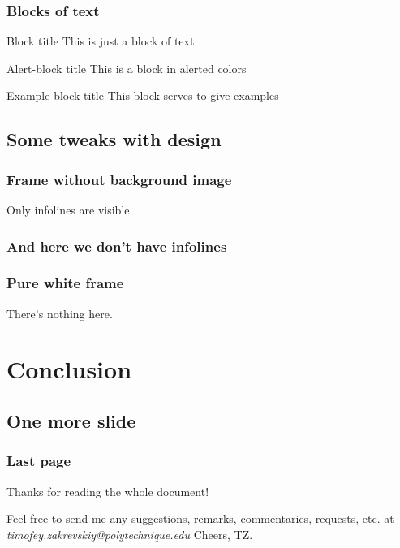 \documentclass{beamer}
\begin{document}
\begin{frame}
\frametitle{Blocks of text}
\begin{block}{Block title}
This is just a block of text
\end{block}

\begin{alertblock}{Alert-block title}
This is a block in alerted colors
\end{alertblock}

\begin{exampleblock}{Example-block title}
This block serves to give examples
\end{exampleblock}
\end{frame}

\subsection{Some tweaks with design}
{ %
\begin{frame}
\frametitle{Frame without background image}


Only infolines are visible.
\end{frame}
}

{%
\begin{frame}
\frametitle{And here we don't have infolines}
\end{frame}
}

{%
\begin{frame}
\frametitle{Pure white frame}

There's nothing here.

\end{frame}
}

\section{Conclusion}
\subsection{One more slide}
\begin{frame}
\frametitle{Last page}
Thanks for reading the whole document!

Feel free to send me any suggestions, remarks, commentaries, requests, etc. at \textit{{\color{Xblue}timofey.zakrevskiy@polytechnique.edu}}
\vfill
Cheers, TZ.
\end{frame}
\end{document}

